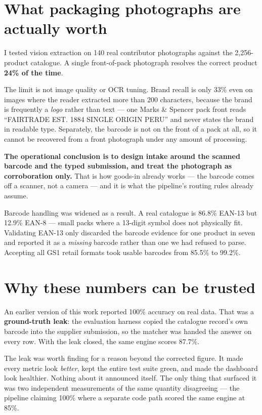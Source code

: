 \section{What packaging photographs are actually worth}

I tested vision extraction on 140 real contributor photographs against the
2{,}256-product catalogue. A single front-of-pack photograph resolves the correct
product \textbf{24\% of the time}.

The limit is not image quality or OCR tuning. Brand recall is only 33\% even on
images where the reader extracted more than 200 characters, because the brand is
frequently a \emph{logo} rather than text --- one Marks \& Spencer pack front reads
``\textsf{FAIRTRADE EST. 1884 SINGLE ORIGIN PERU}'' and never states the brand in
readable type. Separately, the barcode is not on the front of a pack at all, so
it cannot be recovered from a front photograph under any amount of processing.

\textbf{The operational conclusion is to design intake around the scanned barcode
and the typed submission, and treat the photograph as corroboration only.} That
is how goods-in already works --- the barcode comes off a scanner, not a camera ---
and it is what the pipeline's routing rules already assume.

Barcode handling was widened as a result. A real catalogue is 86.8\% EAN-13 but
12.9\% EAN-8 --- small packs where a 13-digit symbol does not physically fit.
Validating EAN-13 only discarded the barcode evidence for one product in seven
and reported it as a \emph{missing} barcode rather than one we had refused to
parse. Accepting all GS1 retail formats took usable barcodes from 85.5\% to
99.2\%.

\section{Why these numbers can be trusted}

An earlier version of this work reported 100\% accuracy on real data. That was a
\textbf{ground-truth leak}: the evaluation harness copied the catalogue record's own
barcode into the supplier submission, so the matcher was handed the answer on
every row. With the leak closed, the same engine scores 87.7\%.

The leak was worth finding for a reason beyond the corrected figure. It made
every metric look \emph{better}, kept the entire test suite green, and made the
dashboard look healthier. Nothing about it announced itself. The only thing that
surfaced it was two independent measurements of the same quantity disagreeing
--- the pipeline claiming 100\% where a separate code path scored the same engine
at 85\%.

